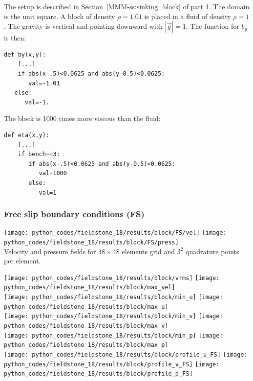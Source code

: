 The setup is described in Section~\ref{MMM-ss:sinking_block} of part 1.
The domain is the unit square.
A block of density $\rho=1.01$ is placed in a fluid of density $\rho=1$.
The gravity is vertical and pointing downward with $|\vec{g}|=1$.
The function for $b_y$ is then:
\begin{lstlisting}
def by(x,y):
    [...]
    if abs(x-.5)<0.0625 and abs(y-0.5)<0.0625:
       val=-1.01
   else:
      val=-1.
\end{lstlisting}
The block is 1000 times more viscous than the fluid:
\begin{lstlisting}
def eta(x,y):
    [...]
    if bench==3:
       if abs(x-.5)<0.0625 and abs(y-0.5)<0.0625:
          val=1000
       else:
          val=1
\end{lstlisting}













\subsubsection*{Free slip boundary conditions (FS)}

\begin{center}
\texttt{[image: python\_codes/fieldstone\_18/results/block/FS/vel]}
\texttt{[image: python\_codes/fieldstone\_18/results/block/FS/press]}\\
{\captionfont Velocity and pressure fields for $48\times 48$ elements grid and $3^2$
quadrature points per element.}
\end{center}


\begin{center}
\texttt{[image: python\_codes/fieldstone\_18/results/block/vrms]}
\texttt{[image: python\_codes/fieldstone\_18/results/block/max\_vel]}\\
\texttt{[image: python\_codes/fieldstone\_18/results/block/min\_u]}
\texttt{[image: python\_codes/fieldstone\_18/results/block/max\_u]}\\
\texttt{[image: python\_codes/fieldstone\_18/results/block/min\_v]}
\texttt{[image: python\_codes/fieldstone\_18/results/block/max\_v]}\\
\texttt{[image: python\_codes/fieldstone\_18/results/block/min\_p]}
\texttt{[image: python\_codes/fieldstone\_18/results/block/max\_p]}\\
\texttt{[image: python\_codes/fieldstone\_18/results/block/profile\_u\_FS]}
\texttt{[image: python\_codes/fieldstone\_18/results/block/profile\_v\_FS]}
\texttt{[image: python\_codes/fieldstone\_18/results/block/profile\_p\_FS]}
\end{center}

